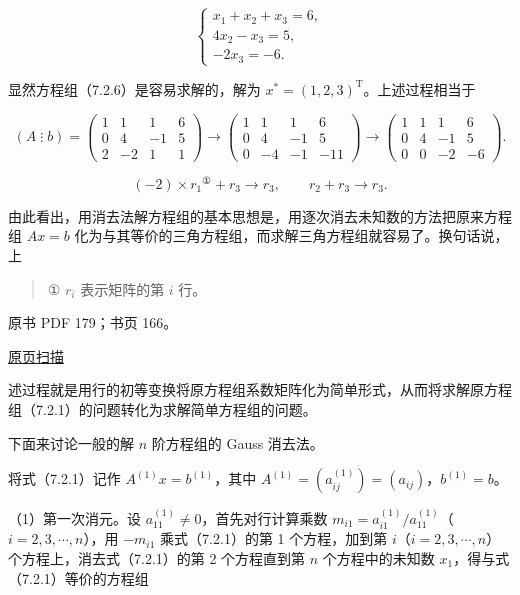 \documentclass[
  10pt,
  fontset=fandol]{ctexart}
\begin{document}
\[
\begin{cases}
x_1+x_2+x_3=6,\\
4x_2-x_3=5,\\
-2x_3=-6.
\end{cases}
\tag{7.2.6}
\]

显然方程组（7.2.6）是容易求解的，解为 \(x^*=(1,2,3)^{\mathrm T}\)。上述过程相当于

\[
(A\mathbin{\vdots}b)=
\left(\begin{array}{rrr|r}1&1&1&6\\0&4&-1&5\\2&-2&1&1\end{array}\right)
\longrightarrow
\left(\begin{array}{rrr|r}1&1&1&6\\0&4&-1&5\\0&-4&-1&-11\end{array}\right)
\longrightarrow
\left(\begin{array}{rrr|r}1&1&1&6\\0&4&-1&5\\0&0&-2&-6\end{array}\right).
\]

\[(-2)\times r_1{}^{\text{①}}+r_3\to r_3,\qquad r_2+r_3\to r_3.\]

由此看出，用消去法解方程组的基本思想是，用逐次消去未知数的方法把原来方程组 \(Ax=b\) 化为与其等价的三角方程组，而求解三角方程组就容易了。换句话说，上

\begin{quote}
① \(r_i\) 表示矩阵的第 \(i\) 行。
\end{quote}

\clearpage

原书 PDF 179；书页 166。

\href{../../../source-images/pdf-179.jpeg}{原页扫描}

述过程就是用行的初等变换将原方程组系数矩阵化为简单形式，从而将求解原方程组（7.2.1）的问题转化为求解简单方程组的问题。

下面来讨论一般的解 \(n\) 阶方程组的 Gauss 消去法。

将式（7.2.1）记作 \(A^{(1)}x=b^{(1)}\)，其中 \(A^{(1)}=(a_{ij}^{(1)})=(a_{ij})\)，\(b^{(1)}=b\)。

（1）第一次消元。设 \(a_{11}^{(1)}\ne0\)，首先对行计算乘数 \(m_{i1}=a_{i1}^{(1)}/a_{11}^{(1)}\)（\(i=2,3,\cdots,n\)），用 \(-m_{i1}\) 乘式（7.2.1）的第 1 个方程，加到第 \(i\)（\(i=2,3,\cdots,n\)）个方程上，消去式（7.2.1）的第 2 个方程直到第 \(n\) 个方程中的未知数 \(x_1\)，得与式（7.2.1）等价的方程组
\end{document}
